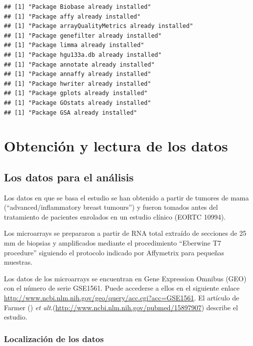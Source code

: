 \documentclass[a4paper]{article}\usepackage[]{graphicx}\usepackage[]{color}
\makeatletter
\newenvironment{kframe}{%
 \def\at@end@of@kframe{}%
 \ifinner\ifhmode%
  \def\at@end@of@kframe{\end{minipage}}%
  \begin{minipage}{\columnwidth}%
 \fi\fi%
 \def\FrameCommand##1{\hskip\@totalleftmargin \hskip-\fboxsep
 \colorbox{shadecolor}{##1}\hskip-\fboxsep
     \hskip-\linewidth \hskip-\@totalleftmargin \hskip\columnwidth}%
 \MakeFramed {\advance\hsize-\width
   \@totalleftmargin\z@ \linewidth\hsize
   \@setminipage}}%
 {\par\unskip\endMakeFramed%
 \at@end@of@kframe}
\newenvironment{knitrout}{}{} %
\newcommand{\etal}{{\it et alt.}}
\makeatother
\begin{document}
\begin{knitrout}
\color{fgcolor}\begin{kframe}
\begin{verbatim}
## [1] "Package Biobase already installed"
## [1] "Package affy already installed"
## [1] "Package arrayQualityMetrics already installed"
## [1] "Package genefilter already installed"
## [1] "Package limma already installed"
## [1] "Package hgu133a.db already installed"
## [1] "Package annotate already installed"
## [1] "Package annaffy already installed"
## [1] "Package hwriter already installed"
## [1] "Package gplots already installed"
## [1] "Package GOstats already installed"
## [1] "Package GSA already installed"
\end{verbatim}
\end{kframe}
\end{knitrout}



\section{Obtención y lectura de los datos}

\subsection{Los datos para el análisis}

Los datos en que se basa el estudio se han obtenido a partir de tumores de mama (``advanced/inflammatory breast tumours'') y fueron tomados antes del tratamiento de pacientes enrolados en un estudio clínico (EORTC 10994). 

Los microarrays se prepararon a partir de RNA total extraído de secciones de 25 mm de biopsias y amplificados mediante el procedimiento ``Eberwine T7 procedure'' siguiendo el protocolo indicado por Affymetrix para pequeñas muestras.

Los datos de los microarrays se encuentran en Gene Expression Omnibus (GEO) con el número de serie GSE1561. Puede accederse a ellos  en el siguiente enlace \url{http://www.ncbi.nlm.nih.gov/geo/query/acc.cgi?acc=GSE1561}. El artículo de Farmer (\cite{Farmer2005}) \etal (\url{http://www.ncbi.nlm.nih.gov/pubmed/15897907}) describe el estudio.

\subsubsection{Localización de los datos }
\end{document}

